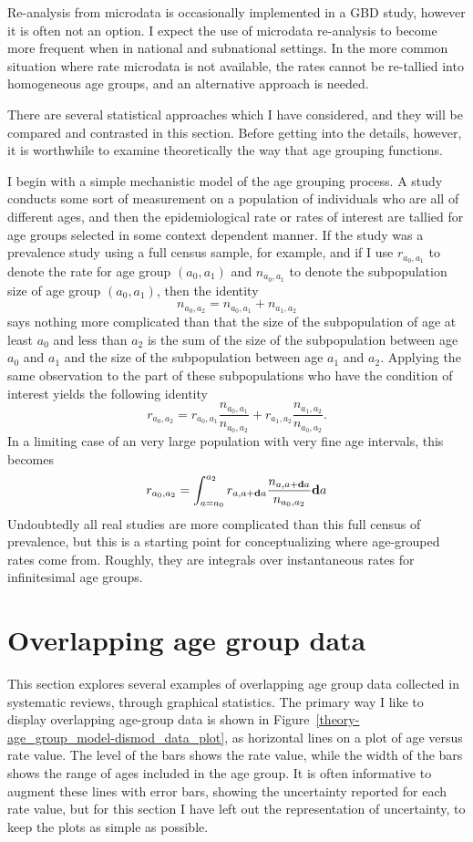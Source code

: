 Re-analysis from microdata is occasionally implemented in a GBD study,
however it is often not an option.  I expect the use of microdata
re-analysis to become more frequent when in national and subnational
settings.  In the more common situation where rate microdata is not
available, the rates cannot be re-tallied into homogeneous age groups,
and an alternative approach is needed.

There are several statistical approaches which I have considered, and
they will be compared and contrasted in this section.  Before getting
into the details, however, it is worthwhile to examine theoretically
the way that age grouping functions.

I begin with a simple mechanistic model of the age grouping process.
A study conducts some sort of measurement on a population of
individuals who are all of different ages, and then the
epidemiological rate or rates of interest are tallied for age groups
selected in some context dependent manner. If the study was a
prevalence study using a full census sample, for example, and if I use
$r_{a_0,a_1}$ to denote the rate for age group $(a_0, a_1)$ and
$n_{a_0,a_1}$ to denote the subpopulation size of age group
$(a_0,a_1)$, then the identity
\[
n_{a_0, a_2} = n_{a_0,a_1} + n_{a_1,a_2}
\]
says nothing more complicated than that the size of the subpopulation
of age at least $a_0$ and less than $a_2$ is the sum of the size of
the subpopulation between age $a_0$ and $a_1$ and the size of the
subpopulation between age $a_1$ and $a_2$.  Applying the same
observation to the part of these subpopulations who have the condition
of interest yields the following identity
\[
r_{a_0,a_2} = r_{a_0,a_1}\frac{n_{a_0,a_1}}{n_{a_0,a_2}} + r_{a_1,a_2}\frac{n_{a_1,a_2}}{n_{a_0,a_2}}. 
\] 
In a limiting case of an very large population with very fine age
intervals, this becomes
\[
r_{a_0,a_2} = \int_{a=a_0}^{a_2} r_{a,a+\mathbf{d} a}\frac{n_{a,a+\mathbf{d} a}}{n_{a_0,a_2}}\mathbf{d} a
\]
Undoubtedly all real studies are more complicated than this full
census of prevalence, but this is a starting point for conceptualizing
where age-grouped rates come from.  Roughly, they are integrals over
instantaneous rates for infinitesimal age groups.

\section{Overlapping age group data}
\label{theory-age_group_model-overlapping_data}
This section explores several examples of overlapping age group data
collected in systematic reviews, through graphical statistics.  The
primary way I like to display overlapping age-group data is shown in
Figure~\ref{theory-age_group_model-dismod_data_plot}, as horizontal
lines on a plot of age versus rate value.  The level of the bars shows
the rate value, while the width of the bars shows the range of ages
included in the age group. It is often informative to augment these
lines with error bars, showing the uncertainty reported for each rate
value, but for this section I have left out the representation of
uncertainty, to keep the plots as simple as possible.

